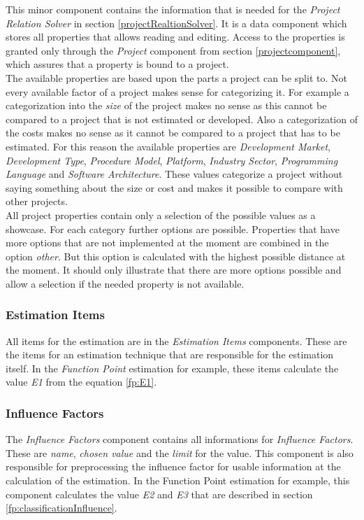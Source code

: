 This minor component contains the information that is needed for the \textit{Project Relation Solver} in section \ref{projectRealtionSolver}. It is a data component which stores all properties that allows reading and editing. Access to the properties is granted only through the \textit{Project} component from section \ref{projectcomponent}, which assures that a property is bound to a project.\\
The available properties are based upon the parts a project can be split to. Not every available factor of a project makes sense for categorizing it. For example a categorization into the \textit{size} of the project makes no sense as this cannot be compared to a project that is not estimated or developed. Also a categorization of the costs makes no sense as it cannot be compared to a project that has to be estimated. For this reason the available properties are \textit{Development Market}, \textit{Development Type}, \textit{Procedure Model}, \textit{Platform}, \textit{Industry Sector}, \textit{Programming Language} and \textit{Software Architecture}. These values categorize a project without saying something about the size or cost and makes it possible to compare with other projects.\\
All project properties contain only a selection of the possible values as a showcase. For each category further options are possible. Properties that have more options that are not implemented at the moment are combined in the option \textit{other}. But this option is calculated with the highest possible distance at the moment. It should only illustrate that there are more options possible and allow a selection if the needed property is not available.
\subsubsection{Estimation Items}

All items for the estimation are in the \textit{Estimation Items} components. These are the items for an estimation technique that are responsible for the estimation itself. In the \textit{Function Point} estimation for example, these items calculate the value \textit{E1} from the equation \ref{fp:E1}.

\subsubsection{Influence Factors}

The \textit{Influence Factors} component contains all informations for \textit{Influence Factors}. These are \textit{name}, \textit{chosen value} and the \textit{limit} for the value. This component is also responsible for preprocessing the influence factor for usable information at the calculation of the estimation. In the Function Point estimation for example, this component calculates the value \textit{E2} and \textit{E3} that are described in section \ref{fp:classificationInfluence}.

